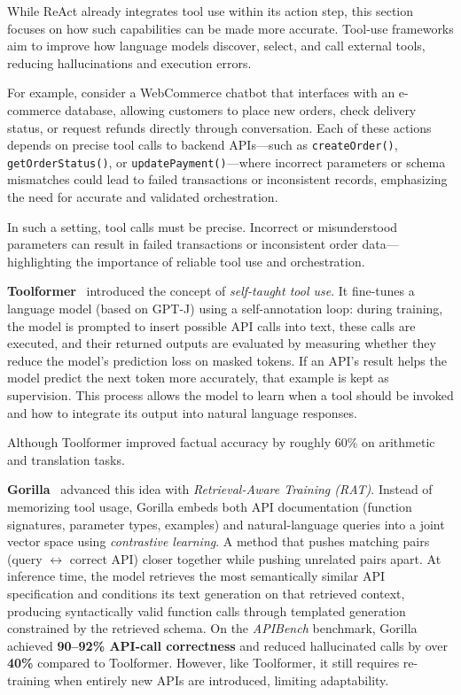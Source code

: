 While ReAct already integrates tool use within its action step, this section focuses on how such capabilities can be made more accurate.  
Tool-use frameworks aim to improve how language models discover, select, and call external tools, reducing hallucinations and execution errors.  

For example, consider a WebCommerce chatbot that interfaces with an e-commerce database, allowing customers to place new orders, check delivery status, or request refunds directly through conversation.
Each of these actions depends on precise tool calls to backend APIs—such as \texttt{createOrder()}, \texttt{getOrderStatus()}, or \texttt{updatePayment()}—where incorrect parameters or schema mismatches could lead to failed transactions or inconsistent records, emphasizing the need for accurate and validated orchestration. 

In such a setting, tool calls must be precise. Incorrect or misunderstood parameters can result in failed transactions or inconsistent order data—highlighting the importance of reliable tool use and orchestration.

\textbf{Toolformer}~\cite{schick2023toolformer} introduced the concept of \emph{self-taught tool use}.  
It fine-tunes a language model (based on GPT-J) using a self-annotation loop: during training, the model is prompted to insert possible API calls into text, these calls are executed, and their returned outputs are evaluated by measuring whether they reduce the model’s prediction loss on masked tokens.  
If an API’s result helps the model predict the next token more accurately, that example is kept as supervision.  
This process allows the model to learn when a tool should be invoked and how to integrate its output into natural language responses.  

Although Toolformer improved factual accuracy by roughly 60\% on arithmetic and translation tasks.

\textbf{Gorilla}~\cite{patil2023gorilla} advanced this idea with \emph{Retrieval-Aware Training (RAT)}.  
Instead of memorizing tool usage, Gorilla embeds both API documentation (function signatures, parameter types, examples) and natural-language queries into a joint vector space using \emph{contrastive learning}. A method that pushes matching pairs (query $\leftrightarrow$ correct API) closer together while pushing unrelated pairs apart.  
At inference time, the model retrieves the most semantically similar API specification and conditions its text generation on that retrieved context, producing syntactically valid function calls through templated generation constrained by the retrieved schema.  
On the \textit{APIBench} benchmark, Gorilla achieved \textbf{90–92\% API-call correctness} and reduced hallucinated calls by over \textbf{40\%} compared to Toolformer.  
However, like Toolformer,  it still requires re-training when entirely new APIs are introduced, limiting adaptability.

